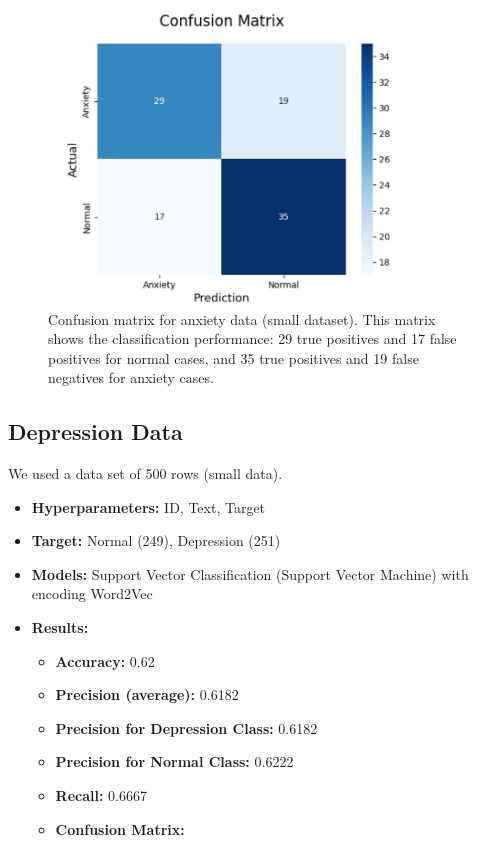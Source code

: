 \documentclass[runningheads,a4paper,11pt]{report}
\begin{document}
\begin{figure}[H]
\centering
\includegraphics[width=0.9\textwidth]{Anxiety-Data-SmallData.jpg}
\caption[Confusion matrix for anxiety data (small dataset)]{\centering Confusion matrix for anxiety data (small dataset). This matrix shows the classification performance: 29 true positives and 17 false positives for normal cases, and 35 true positives and 19 false negatives for anxiety cases.}
\end{figure}


\vspace{0.5cm} %

\subsection{Depression Data}
\label{section:depression}
We used a data set of 500 rows (small data).
\begin{itemize}
    \item \textbf{Hyperparameters:} ID, Text, Target
    \item \textbf{Target:} Normal (249), Depression (251)
    \item \textbf{Models:} Support Vector Classification (Support Vector Machine) with encoding Word2Vec
    \item \textbf{Results:}
    \begin{itemize}
        \item \textbf{Accuracy:} 0.62
        \item \textbf{Precision (average):} 0.6182
        \item \textbf{Precision for Depression Class:} 0.6182
        \item \textbf{Precision for Normal Class:} 0.6222
        \item \textbf{Recall:} 0.6667
        \item \textbf{Confusion Matrix:}
    \end{itemize}
\end{itemize}
\end{document}

